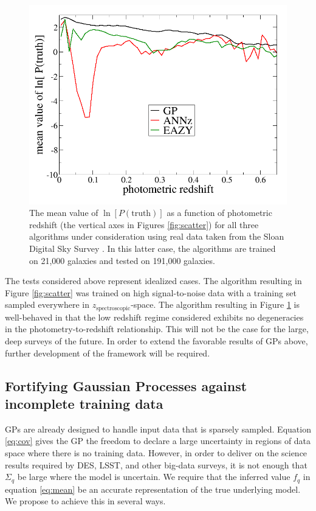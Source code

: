 \documentclass[useAMS,usenatbib,tightenlines,11pt,preprint]{aastex}
\begin{document}
\begin{figure}[th]
\centerline{\includegraphics[scale=0.3]{sdss_lnsum.png}}
\caption{
The mean value of
$\ln[P(\text{truth})]$ as a function of photometric redshift (the vertical
axes in Figures \ref{fig:scatter}) for all
three algorithms under consideration using real
data taken from the Sloan Digital Sky Survey \cite{Abazajian:2008wr}.  
In this latter case, the
algorithms are trained on 21,000 galaxies and tested on 191,000 galaxies.
}
\label{fig:lnsum}
\end{figure}

The tests considered above represent idealized cases.
The algorithm resulting in Figure \ref{fig:scatter} was trained on high
signal-to-noise data with a training set sampled everywhere in
$z_\text{spectroscopic}$-space.  The algorithm resulting in Figure
\ref{fig:lnsum} is well-behaved in that the low redshift regime considered
exhibits no degeneracies in the photometry-to-redshift relationship.  This will
not be the case for the large, deep surveys of the future.  In order to extend
the favorable results of GPs above, further development of the
framework will be required.

\subsection{Fortifying Gaussian Processes against incomplete training data}

GPs are already designed to handle input data that is sparsely
sampled.  Equation \ref{eq:cov} gives the GP the freedom to declare a large
uncertainty in regions of data space where there is no training data.  However,
in order to deliver on the science results required by DES, LSST, and other
big-data surveys, it is not enough that $\Sigma_q$ be large where the model is
uncertain.  We require that the inferred 
value $f_q$ in equation \ref{eq:mean} be an accurate
representation of the true underlying model.  
We propose to achieve this in several ways.
\end{document}
